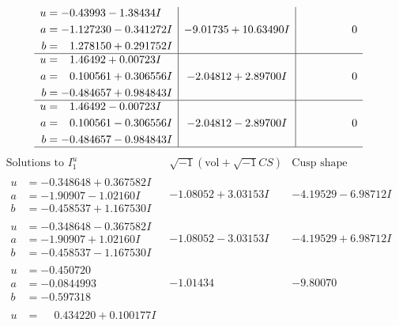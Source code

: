 \documentclass[1p]{elsarticle_modified}
\theoremstyle{definition}
\newcommand{\I}{\sqrt{-1}}
\begin{document}
$$\begin{array}{c|c|c}
\begin{aligned}
u &= -0.43993 - 1.38434 I \\
a &= -1.127230 - 0.341272 I \\
b &= \phantom{-}1.278150 + 0.291752 I\end{aligned}
 & -9.01735 + 10.63490 I & \phantom{-0.000000 } 0 \\ \hline\begin{aligned}
u &= \phantom{-}1.46492 + 0.00723 I \\
a &= \phantom{-}0.100561 + 0.306556 I \\
b &= -0.484657 + 0.984843 I\end{aligned}
 & -2.04812 + 2.89700 I & \phantom{-0.000000 } 0 \\ \hline\begin{aligned}
u &= \phantom{-}1.46492 - 0.00723 I \\
a &= \phantom{-}0.100561 - 0.306556 I \\
b &= -0.484657 - 0.984843 I\end{aligned}
 & -2.04812 - 2.89700 I & \phantom{-0.000000 } 0\\
 \hline 
 \end{array}$$\newpage$$\begin{array}{c|c|c}  
\text{Solutions to }I^u_{1}& \I (\text{vol} + \sqrt{-1}CS) & \text{Cusp shape}\\
 \hline 
\begin{aligned}
u &= -0.348648 + 0.367582 I \\
a &= -1.90907 - 1.02160 I \\
b &= -0.458537 + 1.167530 I\end{aligned}
 & -1.08052 + 3.03153 I & -4.19529 - 6.98712 I \\ \hline\begin{aligned}
u &= -0.348648 - 0.367582 I \\
a &= -1.90907 + 1.02160 I \\
b &= -0.458537 - 1.167530 I\end{aligned}
 & -1.08052 - 3.03153 I & -4.19529 + 6.98712 I \\ \hline\begin{aligned}
u &= -0.450720\phantom{ +0.000000I} \\
a &= -0.0844993\phantom{ +0.000000I} \\
b &= -0.597318\phantom{ +0.000000I}\end{aligned}
 & -1.01434\phantom{ +0.000000I} & -9.80070\phantom{ +0.000000I} \\ \hline\begin{aligned}
u &= \phantom{-}0.434220 + 0.100177 I \\

\end{aligned}
\end{array}$$
\end{document}
